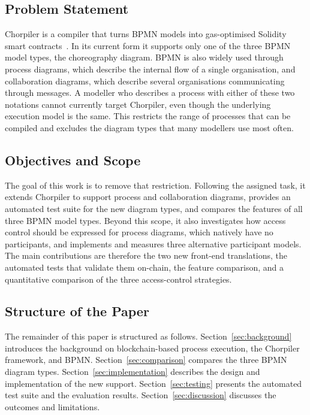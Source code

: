 \documentclass[runningheads]{llncs}
\begin{document}
\subsection{Problem Statement}
Chorpiler is a compiler that turns BPMN models into gas-optimised Solidity smart contracts~\cite{chorpiler}. In its current form it supports only one of the three BPMN model types, the choreography diagram. BPMN is also widely used through process diagrams, which describe the internal flow of a single organisation, and collaboration diagrams, which describe several organisations communicating through messages. A modeller who describes a process with either of these two notations cannot currently target Chorpiler, even though the underlying execution model is the same. This restricts the range of processes that can be compiled and excludes the diagram types that many modellers use most often.

\subsection{Objectives and Scope}
The goal of this work is to remove that restriction. Following the assigned task, it extends Chorpiler to support process and collaboration diagrams, provides an automated test suite for the new diagram types, and compares the features of all three BPMN model types. Beyond this scope, it also investigates how access control should be expressed for process diagrams, which natively have no participants, and implements and measures three alternative participant models. The main contributions are therefore the two new front-end translations, the automated tests that validate them on-chain, the feature comparison, and a quantitative comparison of the three access-control strategies.

\subsection{Structure of the Paper}
The remainder of this paper is structured as follows.
Section~\ref{sec:background} introduces the background on blockchain-based process execution, the Chorpiler framework, and BPMN.
Section~\ref{sec:comparison} compares the three BPMN diagram types. Section~\ref{sec:implementation} describes the design and implementation of the new support. Section~\ref{sec:testing}
presents the automated test suite and the evaluation results.
Section~\ref{sec:discussion} discusses the outcomes and limitations.

\end{document}

